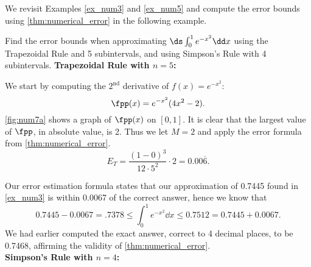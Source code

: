 We revisit Examples \ref{ex_num3} and \ref{ex_num5} and compute the error bounds using \autoref{thm:numerical_error} in the following example.

\begin{example}\label{ex_num7}%
Find the error bounds when approximating $\ds \int_0^1 e^{-x^2}\dd x$ using the Trapezoidal Rule and 5 subintervals, and using Simpson's Rule with 4 subintervals.
\solution
\textbf{Trapezoidal Rule with $n=5$:}

We start by computing the $2^\text{nd}$ derivative of $f(x) = e^{-x^2}$:
%
%
\[\fpp(x) = e^{-x^2}(4x^2-2).\]
\autoref{fig:num7a} shows a graph of $\fpp(x)$ on $[0,1]$. It is clear that the largest value of $\fpp$, in absolute value, is 2. Thus we let $M=2$ and apply the error formula from \autoref{thm:numerical_error}.
\[E_T = \frac{(1-0)^3}{12\cdot 5^2}\cdot 2 = 0.00\overline{6}.\]

Our error estimation formula states that our approximation of 0.7445 found in \autoref{ex_num3} is within 0.0067 of the correct answer, hence we know that
\[0.7445-0.0067 = .7378 \leq \int_0^1e^{-x^2}\dd x \leq 0.7512 = 0.7445 + 0.0067.\]
We had earlier computed the exact answer, correct to 4 decimal places, to be 0.7468, affirming the validity of \autoref{thm:numerical_error}.\bigskip\\
\textbf{Simpson's Rule with $n=4$:}


\end{example}
